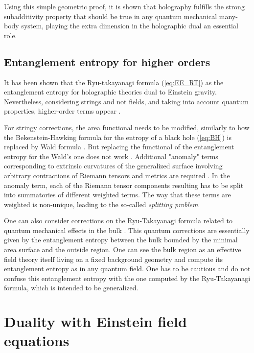 \documentclass[twocolumn]{revtex4}
\begin{document}
Using this simple geometric proof, it is shown that holography fulfills the strong subadditivity property that should be true in any quantum mechanical many-body system, playing the extra dimension in the holographic dual an essential role.


\subsection{Entanglement entropy for higher orders} \label{s:EE_HO}

It has been shown that the Ryu-takayanagi formula (\ref{eq:EE_RT}) as the entanglement entropy for holographic theories dual to Einstein gravity. Nevertheless, considering strings and not fields, and taking into account quantum properties, higher-order terms appear \cite{bueno_holographic_2021}.

For stringy corrections, the area functional needs to be modified, similarly to how the Bekenstein-Hawking formula for the entropy of a black hole (\ref{eq:BH}) is replaced by Wald formula \cite{iyer_properties_1994}. But replacing the functional of the entanglement entropy for the Wald's one does not work \cite{bueno_holographic_2021}. Additional "anomaly" terms corresponding to extrinsic curvatures of the generalized surface involving arbitrary contractions of Riemann tensors and metrics are required \cite{dong_holographic_2014}. In the anomaly term, each of the Riemann tensor components resulting has to be split into summatories of different weighted terms. The way that these terms are weighted is non-unique, leading to the so-called \textit{splitting problem}.

One can also consider corrections on the Ryu-Takayanagi formula related to quantum mechanical effects in the bulk \cite{faulkner_quantum_2013}. This quantum corrections are essentially given by the entanglement entropy between the bulk bounded by the minimal area surface and the outside region. One can see the bulk region as an effective field theory itself living on a fixed background geometry and compute its entanglement entropy as in any quantum field. One has to be cautious and do not confuse this entanglement entropy with the one computed by the Ryu-Takayanagi formula, which is intended to be generalized.


\section{Duality with Einstein field equations} \label{s:EQ}
\end{document}
